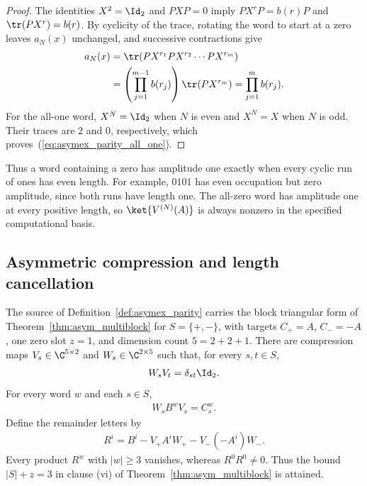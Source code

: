 \begin{proof}
    \leanok
    The identities $X^2=\Id_2$ and $PXP=0$ imply
    $PX^rP=b(r)P$ and $\tr(PX^r)=b(r)$. By cyclicity of the trace,
    rotating the word to start at a zero leaves $a_N(x)$ unchanged, and
    successive contractions give
    \begin{align}
        a_N(x)
         & =\tr(PX^{r_1}PX^{r_2}\cdots PX^{r_m}) \notag       \\
         & =\left(\prod_{j=1}^{m-1}b(r_j)\right)\tr(PX^{r_m})
        =\prod_{j=1}^{m}b(r_j).
        \notag
    \end{align}
    For the all-one word, $X^N=\Id_2$ when $N$ is even and
    $X^N=X$ when $N$ is odd. Their traces are $2$ and $0$,
    respectively, which proves~(\ref{eq:asymex_parity_all_one}).
\end{proof}

Thus a word containing a zero has amplitude one exactly when every
cyclic run of ones has even length. For example, $0101$ has even
occupation but zero amplitude, since both runs have length one.
The all-zero word has amplitude one at every positive length, so
$\ket{V^{(N)}(A)}$ is always nonzero in the specified computational basis.

\subsection{Asymmetric compression and length cancellation}

\begin{lemma}
    \label{thm:asymex_parity_compression}
    \leanok
    The source of Definition~\ref{def:asymex_parity} carries the block
    triangular form of Theorem~\ref{thm:asym_multiblock} for
    $S=\{+,-\}$, with targets $C_+=A$, $C_-=-A$, one zero slot
    $z=1$, and dimension count $5=2+2+1$.
    There are compression maps $V_s\in\C^{5\times2}$ and
    $W_s\in\C^{2\times5}$ such that, for every $s,t\in S$,
    \begin{align}
        W_sV_t=\delta_{st}\Id_2.
        \label{eq:asymex_parity_biorthogonal}
    \end{align}
    For every word $w$ and each $s\in S$,
    \begin{align}
        W_sB^wV_s=C_s^w.
        \label{eq:asymex_parity_reduction}
    \end{align}
    Define the remainder letters by
    \begin{align}
        R^i=B^i-V_+A^iW_+-V_-(-A^i)W_-.
        \label{eq:asymex_parity_remainder}
    \end{align}
    Every product $R^w$ with $|w|\geq3$ vanishes, whereas
    $R^0R^0\neq0$. Thus the bound $|S|+z=3$ in clause (vi) of
    Theorem~\ref{thm:asym_multiblock} is attained.
\end{lemma}

